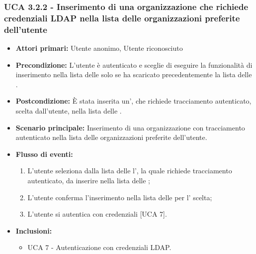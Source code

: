 \subsubsection{UCA 3.2.2 - Inserimento di una organizzazione che richiede credenziali LDAP nella lista delle organizzazioni preferite dell'utente}%
\begin{itemize}
	\item \textbf{Attori primari:} Utente anonimo, Utente riconosciuto
	\item \textbf{Precondizione:} L'utente è autenticato e sceglie di eseguire la funzionalità di inserimento nella lista delle  solo se ha scaricato precedentemente la lista delle .
	\item \textbf{Postcondizione:} È stata inserita un', che richiede tracciamento autenticato, scelta dall'utente, nella lista delle .
	\item \textbf{Scenario principale:} Inserimento di una organizzazione con tracciamento autenticato nella lista delle organizzazioni preferite dell'utente.
	\item \textbf{Flusso di eventi:}
	\begin{enumerate}
		\item L'utente seleziona dalla lista delle  l', la quale richiede tracciamento autenticato, da inserire nella lista delle ;
		\item L'utente conferma l'inserimento nella lista delle  per l' scelta;
		\item L'utente si autentica con credenziali  [UCA 7].
	\end{enumerate}
	\item \textbf{Inclusioni:}
	\begin{itemize}
			\item UCA 7 - Autenticazione con credenziali LDAP.
	\end{itemize}
\end{itemize}

